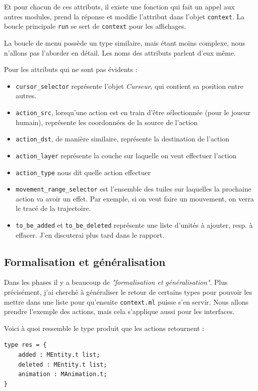 \documentclass{article}
\begin{document}
Et pour chacun de ces attributs, il existe une fonction qui fait un appel aux autres modules, prend la réponse
et modifie l'attribut dans l'objet \texttt{context}. La boucle principale \texttt{run} se sert de \texttt{context}
pour les affichages.

La boucle de menu possède un type similaire, mais étant moins complexe, nous n'allons pas l'aborder en détail. Les noms des attributs parlent d'eux même.

Pour les attributs qui ne sont pas évidents : 

\begin{itemize}
    \item \texttt{cursor\_selector} représente l'objet \textit{Curseur}, qui contient sa position entre autres.
    \item \texttt{action\_src}, lorsqu'une action est en train d'être sélectionnée (pour le joueur humain), représente les coordonnées de la source
de l'action
    \item \texttt{action\_dst}, de manière similaire, représente la destination de l'action
    \item \texttt{action\_layer} représente la couche sur laquelle on veut effectuer l'action
    \item \texttt{action\_type} nous dit quelle action effectuer
    \item \texttt{movement\_range\_selector} est l'ensemble des tuiles sur laquelles la prochaine action va avoir un effet. Par exemple,
    si on veut faire un mouvement, on verra le tracé de la trajectoire.
    \item \texttt{to\_be\_added} et \texttt{to\_be\_deleted} représente une liste d'unités à ajouter, resp. à effacer.
    J'en discuterai plus tard dans le rapport. 
\end{itemize}
\subsection{Formalisation et généralisation}
Dans les phases il y a beaucoup de \textit{"formalisation et généralisation"}. Plus précisément, j'ai cherché
à généraliser le retour de certains types pour pouvoir les mettre dans une liste pour qu'ensuite \texttt{context.ml} puisse s'en servir.
Nous allons prendre l'exemple des actions, mais cela s'applique aussi pour les interfaces.

Voici à quoi ressemble le type produit que les actions retournent : 

\begin{verbatim}
type res = {
    added : MEntity.t list;
    deleted : MEntity.t list;
    animation : MAnimation.t;
}
\end{verbatim}
\end{document}

